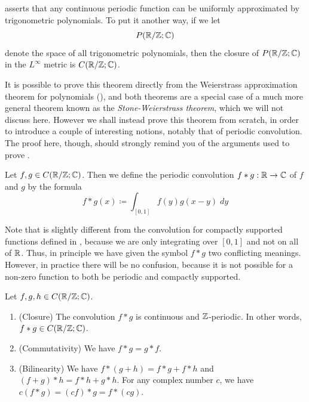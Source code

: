 \begin{note}
   asserts that any continuous periodic function can be uniformly approximated by trigonometric polynomials.
  To put it another way, if we let
  \[
    P(\mathbb{R} / \mathbb{Z} ; \mathbb{C})
  \]
  denote the space of all trigonometric polynomials, then the closure of \(P(\mathbb{R} / \mathbb{Z} ; \mathbb{C})\) in the \(L^\infty\) metric is \(C(\mathbb{R} / \mathbb{Z} ; \mathbb{C})\).
\end{note}

\begin{note}
  It is possible to prove this theorem directly from the Weierstrass approximation theorem for polynomials (), and both theorems are a special case of a much more general theorem known as the \emph{Stone-Weierstrass theorem}, which we will not discuss here.
  However we shall instead prove this theorem from scratch, in order to introduce a couple of interesting notions, notably that of periodic convolution.
  The proof here, though, should strongly remind you of the arguments used to prove .
\end{note}

\begin{defn}\label{ii:5.4.2}
  Let \(f, g \in C(\mathbb{R} / \mathbb{Z} ; \mathbb{C})\).
  Then we define the periodic convolution \(f * g : \mathbb{R} \to \mathbb{C}\) of \(f\) and \(g\) by the formula
  \[
    f * g(x) \coloneqq \int_{[0, 1]} f(y) g(x - y) \; dy
  \]
\end{defn}

\begin{rmk}\label{ii:5.4.3}
  Note that  is slightly different from the convolution for compactly supported functions defined in , because we are only integrating over \([0, 1]\) and not on all of \(\mathbb{R}\).
  Thus, in principle we have given the symbol \(f * g\) two conflicting meanings.
  However, in practice there will be no confusion, because it is not possible for a non-zero function to both be periodic and compactly supported.
\end{rmk}

\begin{lem}\label{ii:5.4.4}
  Let \(f, g, h \in C(\mathbb{R} / \mathbb{Z} ; \mathbb{C})\).
  \begin{enumerate}
    \item\label{ii:5.4.4.a} (Closure)
    The convolution \(f * g\) is continuous and \(\mathbb{Z}\)-periodic.
    In other words, \(f * g \in C(\mathbb{R} / \mathbb{Z} ; \mathbb{C})\).
    \item\label{ii:5.4.4.b} (Commutativity)
    We have \(f * g = g * f\).
    \item\label{ii:5.4.4.c} (Bilinearity)
    We have \(f * (g + h) = f * g + f * h\) and \((f + g) * h = f * h + g * h\).
    For any complex number \(c\), we have \(c(f * g) = (cf) * g = f * (cg)\).
  \end{enumerate}
\end{lem}

